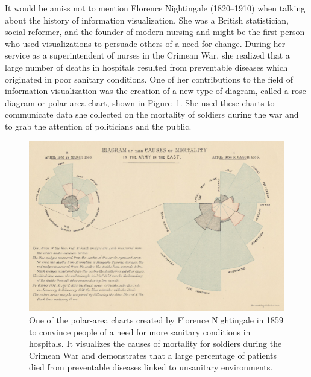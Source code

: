 It would be amiss not to mention Florence Nightingale (1820--1910)
\parencite{FlorenceNightingale, NightingaleBook} when talking about
the history of information visualization. She was a British
statistician, social reformer, and the founder of modern nursing and
might be the first person who used visualizations to persuade others
of a need for change. During her service as a superintendent of nurses
in the Crimean War, she realized that a large number of deaths in
hospitals resulted from preventable diseases which originated in poor
sanitary conditions. One of her contributions to the field of
information visualization was the creation of a new type of diagram,
called a rose diagram or polar-area chart, shown in
Figure~\ref{fig:NightingalePolarAreaChart}. She used these charts to
communicate data she collected on the mortality of soldiers during the
war and to grab the attention of politicians and the public.

\begin{figure}[tp]
\centering
\includegraphics[keepaspectratio,width=\linewidth,height=\thirdh]
{images/nightingale.png}
\caption[Polar-Area Chart by Florence Nightingale from 1859]{%
One of the polar-area charts created by Florence Nightingale in 1859
to convince people of a need for more sanitary conditions in
hospitals. It visualizes the causes of mortality for soldiers during
the Crimean War and demonstrates that a large percentage of patients
died from preventable diseases linked to unsanitary environments.
}
\label{fig:NightingalePolarAreaChart}
\end{figure}




